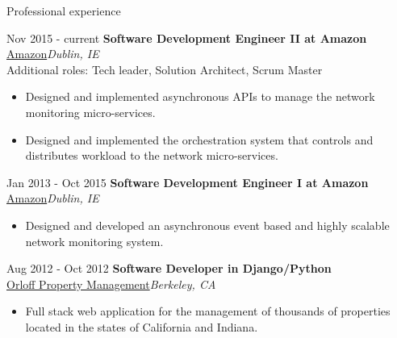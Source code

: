 \begin{cvlist}{Professional experience}
  \item[\footnotesize{Nov 2015 - current}] \textbf{Software Development Engineer II at Amazon}\\
  \href{http://www.amazon.com}{Amazon}\hfill\textit{Dublin, IE}\\
  Additional roles: Tech leader, Solution Architect, Scrum Master
  \begin{small}
    \begin{itemize}
      \item Designed and implemented asynchronous APIs to manage the network monitoring micro-services.
      \item Designed and implemented the orchestration system that controls and distributes workload to the network micro-services.
    \end{itemize}
  \end{small}
  \item[\footnotesize{Jan 2013 - Oct 2015}] \textbf{Software Development Engineer I at Amazon}\\
  \href{http://www.amazon.com}{Amazon}\hfill\textit{Dublin, IE}
  \begin{small}
    \begin{itemize}
      \item Designed and developed an asynchronous event based and highly scalable network monitoring system.
    \end{itemize}
  \end{small}
  \item[\footnotesize{Aug 2012 - Oct 2012}] \textbf{Software Developer in Django/Python}\\
  \href{http://opmservice.com}{Orloff Property Management}\hfill\textit{Berkeley, CA}
  \begin{small}
    \begin{itemize}
      \item Full stack web application for the management of
            thousands of properties located in the states
            of California and Indiana.\\
\end{itemize}
\end{small}
\end{cvlist}
